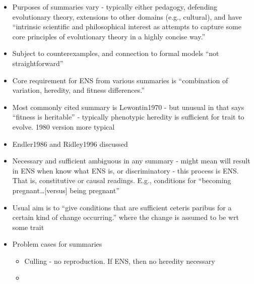 \begin{itemize}
	\item
	
	Purposes of summaries vary - typically either pedagogy, defending
	evolutionary theory, extensions to other domains (e.g., cultural), and
	have ``intrinsic scientific and philosophical interest as attempts to
	capture some core principles of evolutionary theory in a highly
	concise way.''
	
	\item
	
	Subject to counterexamples, and connection to formal models ``not
	straightforward''
	
	\item
	
	Core requirement for ENS from various summaries is ``combination of
	variation, heredity, and fitness differences.''
	
	\item
	
	Most commonly cited summary is Lewontin1970 - but unusual in that says
	``fitness is heritable'' - typically phenotypic heredity is sufficient
	for trait to evolve. 1980 version more typical
	
	\item
	
	Endler1986 and Ridley1996 discussed
	
	\item
	
	Necessary and sufficient ambiguous in any summary - might mean will
	result in ENS when know what ENS is, or discriminatory - this process
	is ENS. That is, constitutive or causal readings. E.g., conditions for
	``becoming pregnant\ldots{}{[}versus{]} being pregnant''
	
	\item
	
	Usual aim is to ``give conditions that are sufficient ceteris paribus
	for a certain kind of change occurring.'' where the change is assumed
	to be wrt some trait
	
	\item
	
	Problem cases for summaries
	
	
	\begin{itemize}
		\item
		
		Culling - no reproduction. If ENS, then no heredity necessary
		
		\item
		

\end{itemize}
\end{itemize}
